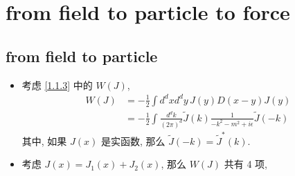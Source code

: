 \chapter{from field to particle to force}
\section{from field to particle}
\begin{itemize}
	\item 考虑 \eqref{1.1.3} 中的 $W(J)$,
	\begin{align}
		W(J) &= - \frac{1}{2} \int d^d x d^d y \, J(y) D(x - y) J(y) \\
		&= - \frac{1}{2} \int \frac{d^d k}{(2 \pi)^d} \tilde{J}(k) \frac{1}{- k^2 - m^2 + i \epsilon} \tilde{J}(- k)
	\end{align}
	其中, 如果 $J(x)$ 是实函数, 那么 $\tilde{J}(- k) = \tilde{J}^*(k)$.
	
	\item 考虑 $J(x) = J_1(x) + J_2(x)$, 那么 $W(J)$ 共有 4 项, 
\end{itemize}
